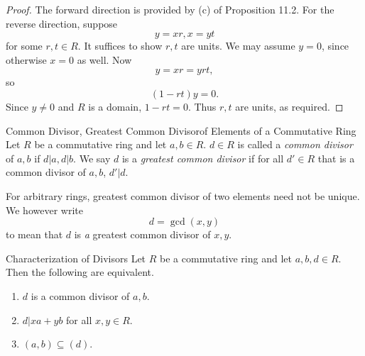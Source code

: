 \documentclass[pmath347]{subfiles}
\begin{document}
    \begin{proof}
        The forward direction is provided by (c) of Proposition 11.2. For the reverse direction, suppose
        \begin{equation*}
            y = xr, x=yt
        \end{equation*}
        for some $r,t\in R$. It suffices to show $r,t$ are units. We may assume $y=0$, since otherwise $x=0$ as well. Now
        \begin{equation*}
            y = xr = yrt, 
        \end{equation*}
        so
        \begin{equation*}
            \left( 1-rt \right) y = 0.
        \end{equation*}
        Since $y\neq 0$ and $R$ is a domain, $1-rt=0$. Thus $r,t$ are units, as required.
    \end{proof}

    \begin{definition}{Common Divisor, Greatest Common Divisor}{of Elements of a Commutative Ring}
        Let $R$ be a commutative ring and let $a,b\in R$. $d\in R$ is called a \emph{common divisor} of $a,b$ if $d|a, d|b$. We say $d$ is a \emph{greatest common divisor} if for all $d'\in R$ that is a common divisor of $a,b$, $d'|d$.
    \end{definition}

    \np For arbitrary rings, greatest common divisor of two elements need not be unique. We however write
    \begin{equation*}
        d = \gcd\left( x,y \right) 
    \end{equation*}
    to mean that $d$ is \textit{a} greatest common divisor of $x,y$.

    \clearpage
    \begin{prop}{Characterization of Divisors}
        Let $R$ be a commutative ring and let $a,b,d\in R$. Then the following are equivalent.
        \begin{enumerate}
            \item $d$ is a common divisor of $a,b$.
            \item $d|xa+yb$ for all $x,y\in R$.
            \item $\left( a,b \right) \subseteq\left( d \right)$.
        \end{enumerate}
    \end{prop}
\end{document}
